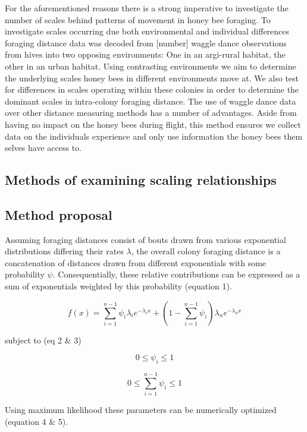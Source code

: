 \documentclass[11pt,usenames,dvipsnames]{article}
\begin{document}
For the aforementioned reasons there is a strong imperative to investigate the number of scales behind patterns of movement in honey bee foraging. To investigate scales occurring due both environmental and individual differences foraging distance data was decoded from [number] waggle dance observations from hives into two opposing environments: One in an argi-rural habitat, the other in an urban habitat. Using contrasting environments we aim to determine the underlying scales honey bees in different environments move at. We also test for differences in scales operating within these colonies in order to determine the dominant scales in intra-colony foraging distance. The use of waggle dance data over other distance measuring methods has a number of advantages. Aside from having no impact on the honey bees during flight, this method ensures we collect data on the individuals experience and only use information the honey bees them selves have access to. 


\subsection{Methods of examining scaling relationships}


\subsection{Method proposal}
Assuming foraging distances consist of bouts drawn from various exponential distributions differing their rates $\lambda$, the overall colony foraging distance is a concatenation of distances drawn from different exponentials with some probability $\psi$. Consequentially, these relative contributions can be expressed as a sum of exponentials weighted by this probability (equation 1).  

\begin{equation}
f(x) = \sum_{i=1}^{n-1} \psi_i \lambda_i e^{-\lambda_i x} + \left(1 - \sum_{i=1}^{n-1}\psi_i\right) \lambda_n e^{-\lambda_n x}
\end{equation}

subject to (eq 2 \& 3)

\begin{equation}
0\leq \psi_i \leq 1
\end{equation}

\begin{equation}
0\leq \sum_{i=1}^{n-1}\psi_i \leq 1
\end{equation}

Using maximum likelihood these parameters can be numerically optimized (equation 4 \& 5).
\end{document}
